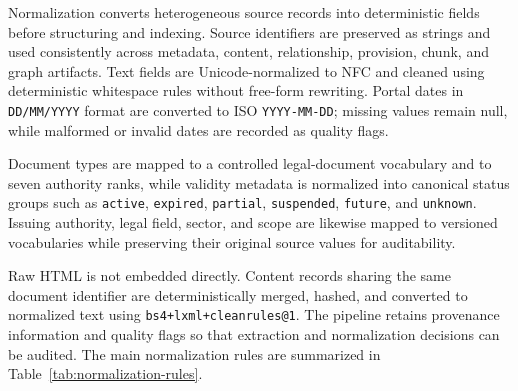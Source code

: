 Normalization converts heterogeneous source records into deterministic fields before structuring and indexing. Source identifiers are preserved as strings and used consistently across metadata, content, relationship, provision, chunk, and graph artifacts. Text fields are Unicode-normalized to NFC and cleaned using deterministic whitespace rules without free-form rewriting. Portal dates in \texttt{DD/MM/YYYY} format are converted to ISO \texttt{YYYY-MM-DD}; missing values remain null, while malformed or invalid dates are recorded as quality flags.

Document types are mapped to a controlled legal-document vocabulary and to seven authority ranks, while validity metadata is normalized into canonical status groups such as \texttt{active}, \texttt{expired}, \texttt{partial}, \texttt{suspended}, \texttt{future}, and \texttt{unknown}. Issuing authority, legal field, sector, and scope are likewise mapped to versioned vocabularies while preserving their original source values for auditability.

Raw HTML is not embedded directly. Content records sharing the same document identifier are deterministically merged, hashed, and converted to normalized text using \texttt{bs4+lxml+cleanrules@1}. The pipeline retains provenance information and quality flags so that extraction and normalization decisions can be audited. The main normalization rules are summarized in Table~\ref{tab:normalization-rules}.

